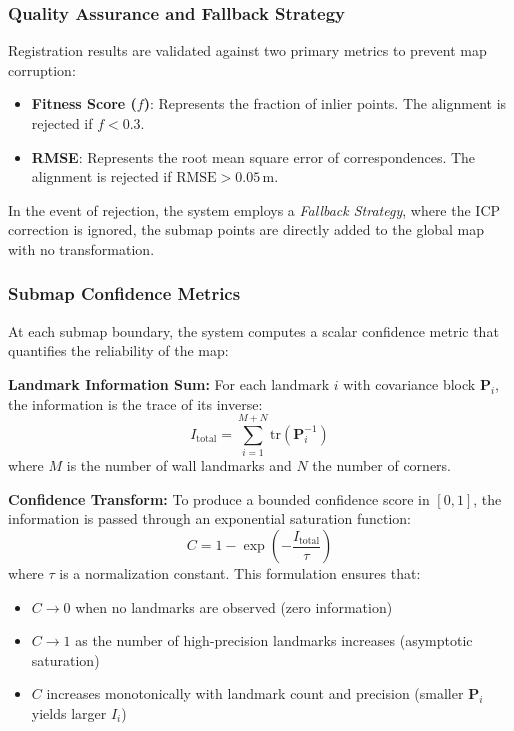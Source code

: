\documentclass[11pt]{article}
\begin{document}
\subsubsection{Quality Assurance and Fallback Strategy}
Registration results are validated against two primary metrics to prevent map corruption:
\begin{itemize}
	\item \textbf{Fitness Score ($f$)}: Represents the fraction of inlier points. The alignment is rejected if $f < 0.3$.
	\item \textbf{RMSE}: Represents the root mean square error of correspondences. The alignment is rejected if $\text{RMSE} > 0.05\,\text{m}$.
\end{itemize}

In the event of rejection, the system employs a \textit{Fallback Strategy}, where the ICP correction is ignored, the submap points are directly added to the global map with no transformation. 

\subsubsection{Submap Confidence Metrics}

At each submap boundary, the system computes a scalar confidence metric that quantifies the reliability of the map:

\textbf{Landmark Information Sum:} For each landmark $i$ with covariance block $\mathbf{P}_{i}$, the information is the trace of its inverse:
\begin{equation}
	I_{\text{total}} = \sum_{i=1}^{M+N} \text{tr}(\mathbf{P}_i^{-1})
\end{equation}
where $M$ is the number of wall landmarks and $N$ the number of corners.

\textbf{Confidence Transform:} To produce a bounded confidence score in $[0, 1]$, the information is passed through an exponential saturation function:
\begin{equation}
	C = 1 - \exp\left(-\frac{I_{\text{total}}}{\tau}\right)
\end{equation}
where $\tau$ is a normalization constant. This formulation ensures that:
\begin{itemize}
	\item $C \to 0$ when no landmarks are observed (zero information)
	\item $C \to 1$ as the number of high-precision landmarks increases (asymptotic saturation)
	\item $C$ increases monotonically with landmark count and precision (smaller $\mathbf{P}_i$ yields larger $I_i$)
\end{itemize}
\end{document}
